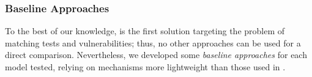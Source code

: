 

\subsubsection{Baseline Approaches}
\label{subsub:baselines}

To the best of our knowledge, \vuteco is the first solution targeting the problem of matching tests and vulnerabilities; thus, no other approaches can be used for a direct comparison.
Nevertheless, we developed some \textit{baseline approaches} for each model tested, relying on mechanisms more lightweight than those used in \vuteco.

